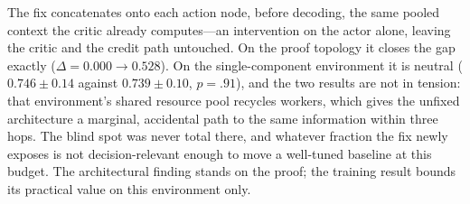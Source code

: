 \documentclass[review,authoryear,3p,times]{elsarticle}
\begin{document}
The fix concatenates onto each action node, before decoding, the same pooled
context the critic already computes---an intervention on the actor alone,
leaving the critic and the credit path untouched. On the proof topology it
closes the gap exactly ($\Delta=0.000\to0.528$). On the single-component
environment it is neutral ($0.746\pm0.14$ against $0.739\pm0.10$, $p=.91$), and
the two results are not in tension: that environment's shared resource pool
recycles workers, which gives the unfixed architecture a marginal, accidental
path to the same information within three hops. The blind spot was never total
there, and whatever fraction the fix newly exposes is not decision-relevant
enough to move a well-tuned baseline at this budget. The architectural finding
stands on the proof; the training result bounds its practical value on this
environment only.



\end{document}
